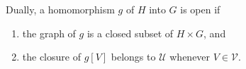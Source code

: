 Dually, a homomorphism $g$ of $H$ into $G$ is open if
\begin{enumerate}
\item[(i)*] the graph of $g$ is a closed subset of $H \times G$, and
\item[(ii)*] the closure of $g[V]$ belongs to $\mathcal{U}$ whenever $V \in \mathcal{V}$.
\end{enumerate}

